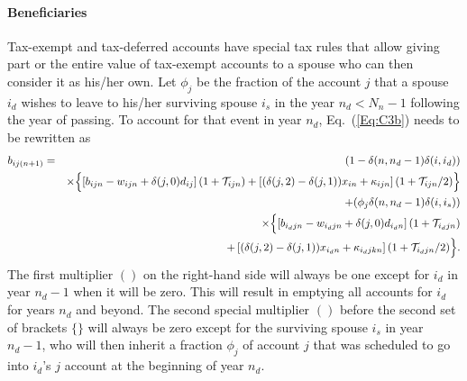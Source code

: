 \documentclass{report}[fleqn,12pt]
\begin{document}
\paragraph*{Beneficiaries}
Tax-exempt and tax-deferred accounts have special tax rules that allow giving part
or the entire value of
tax-exempt accounts to a spouse who can then consider it as his/her own.
Let $\phi_j$ be the fraction of the account $j$ that a spouse $i_d$ wishes
to leave to his/her surviving spouse $i_s$
in the year $n_d < N_n - 1$ following the year of passing. 
To account for that event in year $n_d$, Eq.~(\ref{Eq:C3b}) needs to be rewritten as
\begin{eqnarray}
	b_{ij(n+1)} &=& (1 - \delta(n, n_d-1)\delta(i, i_d)) \nonumber \\
	&&\times \Bigl\{\left[b_{ijn} - w_{ijn} + \delta(j, 0)d_{ij}\right](1 + \mathcal{T}_{ijn})
	+ \left[(\delta(j, 2) - \delta(j, 1))x_{in} + \kappa_{ijn}\right](1 + \mathcal{T}_{ijn}/2) 
	\Bigr\}\nonumber \\
	&& + (\phi_j\delta(n, n_d-1)\delta(i, i_s)) \nonumber  \\
	&& \times \Bigl\{\left[b_{i_djn} - w_{i_djn} + \delta(j, 0)d_{i_dn}\right](1 + \mathcal{T}_{i_djn})
	\nonumber\\
	&& + \left[(\delta(j, 2) - \delta(j, 1))x_{i_dn} + \kappa_{i_djkn}\right](1 + \mathcal{T}_{i_djn}/2) 
	\Bigr\}.
\end{eqnarray}
The first multiplier $()$ on the right-hand side will always be one except for $i_d$ in
year $n_d-1$ when it will be zero. This will result in emptying all accounts for $i_d$ for years
$n_d$ and beyond.
The second special multiplier $()$ before the second set of brackets
$\{\}$ will always be zero except for the surviving
spouse $i_s$ in year $n_d-1$, who will then inherit a fraction $\phi_j$ of account $j$ that
was scheduled to go into $i_d$'s $j$ account at the beginning of year $n_d$.
\end{document}
